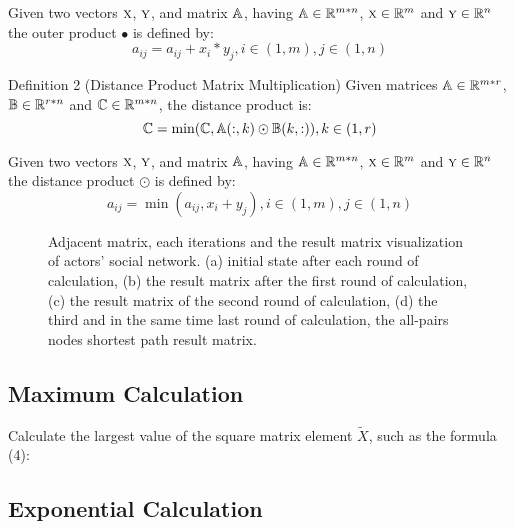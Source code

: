 \documentclass[review]{cvpr}
\begin{document}
Given two vectors \(\textsc x\), \(\textsc y\), and matrix \(\Bbb A\), having \(\Bbb A \in \Bbb R^{m*n}\), \(\textsc x \in \Bbb R^{m}\) and \(\textsc y \in \Bbb R^{n}\) the outer product \(\bullet\) is defined by:
\begin{equation}
a_{ij} = a_{ij} + x_i * y_j, i \in (1,m), j \in (1,n)
\end{equation}

Definition 2 (Distance Product Matrix Multiplication) Given matrices \(\Bbb A \in \Bbb R^{m*r}\), \(\Bbb B \in \Bbb R^{r*n}\) and \(\Bbb C \in \Bbb R^{m*n}\), the distance product is:
\begin{equation}
  \Bbb C = \min(\Bbb C, \Bbb A(:,k)\odot \Bbb B(k,:)) , k \in (1,r)
\end{equation}

Given two vectors \(\textsc x\), \(\textsc y\), and matrix \(\Bbb A\), having \(\Bbb A \in \Bbb R^{m*n}\), \(\textsc x \in \Bbb R^{m}\) and \(\textsc y \in \Bbb R^{n}\) the distance product \(\odot\) is defined by:
\begin{equation}
a_{ij} = \min(a_{ij} , x_i + y_j), i \in (1,m), j \in (1,n)
\end{equation}
\begin{figure*}
\begin{center}
\end{center}
   \caption{Adjacent matrix, each iterations and the result matrix visualization of actors' social network. (a) initial state after each round of calculation, (b) the result matrix after the first round of calculation, (c) the result matrix of the second round of calculation, (d) the third and in the same time last round of calculation, the all-pairs nodes shortest path result matrix.}
\label{fig:short}
\end{figure*}


\subsection{Maximum Calculation}

Calculate the largest value of the square matrix element $\widetilde X$, such as the formula (4):

\subsection{Exponential Calculation}
\end{document}
